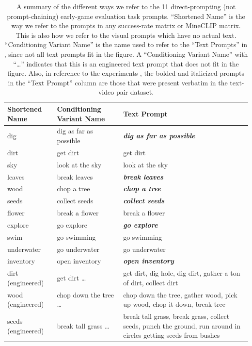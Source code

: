 \renewcommand{\arraystretch}{1.25}
\begin{table}[h]
\begin{center}
\begin{tabularx}{\textwidth}{|>{\raggedright\arraybackslash}X|>{\raggedright\arraybackslash}X|>{\raggedright\arraybackslash}X|}
\hline
\textbf{Shortened Name} & \textbf{Conditioning Variant Name} & \textbf{Text Prompt} \\
\hline
dig & dig as far as possible & \textit{\textbf{dig as far as possible}} \\
\hline
dirt & get dirt & get dirt \\
\hline
sky & look at the sky & look at the sky \\
\hline
leaves & break leaves & \textit{\textbf{break leaves}} \\
\hline
wood & chop a tree & \textit{\textbf{chop a tree}} \\
\hline
seeds & collect seeds & \textit{\textbf{collect seeds}} \\
\hline
flower & break a flower & break a flower \\
\hline
explore & go explore & \textit{\textbf{go explore}} \\
\hline
swim & go swimming & go swimming \\
\hline
underwater & go underwater & go underwater \\
\hline
inventory & open inventory & \textit{\textbf{open inventory}} \\
\hline
dirt (engineered) & get dirt \dots & get dirt, dig hole, dig dirt, gather a ton of dirt, collect dirt \\
\hline
wood (engineered) & chop down the tree \dots &  chop down the tree, gather wood, pick up wood, chop it down, break tree\\
\hline
seeds (engineered) & break tall grass \dots & break tall grass, break grass, collect seeds, punch the ground, run around in circles getting seeds from bushes\\
\hline
\end{tabularx}
\end{center}
\caption{A summary of the different ways we refer to the 11 direct-prompting (not prompt-chaining) early-game evaluation task prompts. ``Shortened Name'' is the way we refer to the prompts in any success-rate matrix or MineCLIP matrix. This is also how we refer to the visual prompts which have no actual text. ``Conditioning Variant Name'' is the name used to refer to the ``Text Prompts'' in , since not all text prompts fit in the figure. A ``Conditioning Variant Name'' with ``\dots'' indicates that this is an engineered text prompt that does not fit in the figure. Also, in reference to the experiments , the bolded and italicized prompts in the ``Text Prompt'' column are those that were present verbatim in the text-video pair dataset.
}
\label{tab:apdx_text_prompt}
\end{table}



